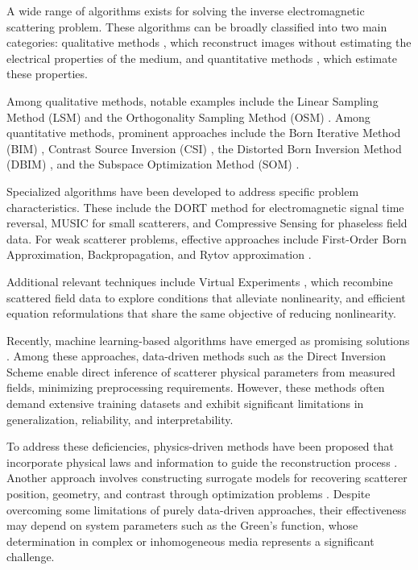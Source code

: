 \documentclass{IEEEtran}
\begin{document}
        A wide range of algorithms exists for solving the inverse electromagnetic scattering problem. These algorithms can be broadly classified into two main categories: qualitative methods \cite{pastorino2010ch5}, which reconstruct images without estimating the electrical properties of the medium, and quantitative methods \cite{pastorino2010ch7}, which estimate these properties. 

        Among qualitative methods, notable examples include the Linear Sampling Method (LSM) \cite{chen2017lsm} and the Orthogonality Sampling Method (OSM) \cite{harris2020orthogonality}. Among quantitative methods, prominent approaches include the Born Iterative Method (BIM) \cite{wang1989iterative}, Contrast Source Inversion (CSI) \cite{berg1997contrast}, the Distorted Born Inversion Method (DBIM) \cite{chew1990reconstruction}, and the Subspace Optimization Method (SOM) \cite{chen2010subspace}.

        Specialized algorithms have been developed to address specific problem characteristics. These include the DORT method \cite{chen2018computational} for electromagnetic signal time reversal, MUSIC \cite{zhong2007music} for small scatterers, and Compressive Sensing \cite{massa2015compressive} for phaseless field data. For weak scatterer problems, effective approaches include First-Order Born Approximation, Backpropagation, and Rytov approximation \cite{chen2018computational}. 

        Additional relevant techniques include Virtual Experiments \cite{isernia2024some,bevacqua2021simple}, which recombine scattered field data to explore conditions that alleviate nonlinearity, and efficient equation reformulations \cite{isernia2024some,bevacqua2021effective} that share the same objective of reducing nonlinearity.

        Recently, machine learning-based algorithms have emerged as promising solutions \cite{chen2020review}. Among these approaches, data-driven methods such as the Direct Inversion Scheme \cite{yao2020enhanced,wei2019solving} enable direct inference of scatterer physical parameters from measured fields, minimizing preprocessing requirements. However, these methods often demand extensive training datasets and exhibit significant limitations in generalization, reliability, and interpretability. 

        To address these deficiencies, physics-driven methods have been proposed that incorporate physical laws and information to guide the reconstruction process \cite{wei2019physics,wang2023push,hu2023more,liu2025exploring}. Another approach involves constructing surrogate models for recovering scatterer position, geometry, and contrast through optimization problems \cite{salucci2022learned,zardi2025physics}. Despite overcoming some limitations of purely data-driven approaches, their effectiveness may depend on system parameters such as the Green's function, whose determination in complex or inhomogeneous media represents a significant challenge.
\end{document}
